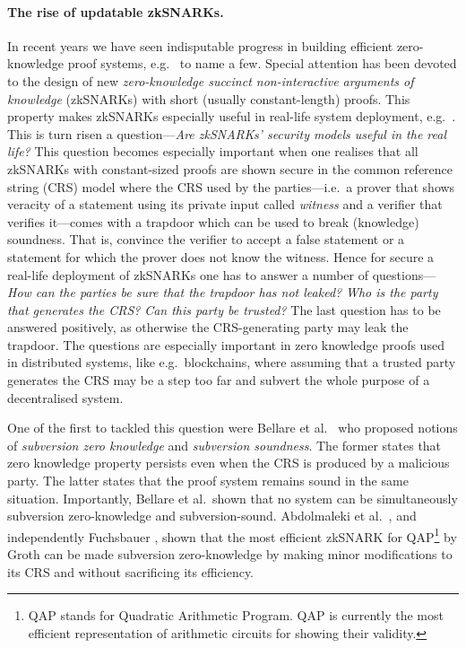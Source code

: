 \let\accentvec\vec \documentclass[runningheads,10pt]{llncs}
\begin{document}
\paragraph{The rise of updatable
zkSNARKs.} 
In recent years we have seen indisputable progress in building efficient zero-knowledge
proof systems,
e.g.~\cite{AC:Groth10a,TCC:Lipmaa12,EC:GGPR13,SP:PHGR13,AC:Lipmaa13,AC:DFGK14,EC:Groth16,SP:BBBPWM18}
to name a few. Special attention has been devoted to the design of new
\emph{zero-knowledge succinct non-interactive arguments of knowledge} (zkSNARKs) with short (usually constant-length) proofs.
This property makes zkSNARKs especially useful in real-life system deployment,
e.g.~\cite{REPO:Zcash20,ARXIV:RonZaj19,REPO:Zeth20,REPO:Celo20,REPO:Aztec20}.
This is turn risen a question---\emph{Are zkSNARKs' security models useful in
the real life?} This question becomes especially important when one realises that all
zkSNARKs with constant-sized proofs are shown secure in the common
reference string (CRS) model where the CRS used by the parties---i.e.~a prover
that shows veracity of a statement using its private input called
\emph{witness} and a verifier that verifies it---comes with a trapdoor which
can be used to break (knowledge) soundness. That is, convince the verifier to
accept a false statement or a statement for which the prover does not
know the witness. Hence for secure a real-life deployment of zkSNARKs one has
to answer a number of questions---\emph{How can the parties be sure that the
trapdoor has not leaked?} \emph{Who is the party that generates the CRS?}
\emph{Can this party be trusted?} The last question has to be answered
positively, as otherwise the CRS-generating party may leak the trapdoor. The
questions are especially important in zero knowledge proofs used in
distributed systems, like e.g.~blockchains, where assuming that a trusted
party generates the CRS may be a step too far and subvert the whole purpose of
a decentralised system. 

One of the first to tackled this question were Bellare et al.~\cite{AC:BelFucSca16} who
proposed notions of \emph{subversion zero knowledge} and \emph{subversion
soundness}. The former states that zero knowledge property persists even when
the CRS is produced by a malicious party. The latter states that the proof
system remains sound in the same situation. Importantly, Bellare et al.~shown
that no system can be simultaneously subversion zero-knowledge and subversion-sound.
Abdolmaleki et al.~\cite{AC:ABLZ17}, and independently Fuchsbauer
\cite{PKC:Fuchsbauer18}, shown that the most
efficient zkSNARK for QAP\footnote{QAP stands for Quadratic Arithmetic
Program. QAP is currently the most efficient representation of arithmetic
circuits for showing their validity.} by Groth \cite{EC:Groth16} can be made
subversion zero-knowledge by making minor modifications to its CRS and without
sacrificing its efficiency. 
\end{document}
